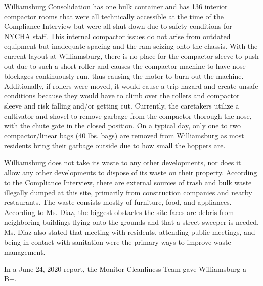 Williamsburg Consolidation has one bulk container and has 136 interior compactor rooms that were all technically accessible at the time of the Compliance Interview but were all shut down due to safety conditions for NYCHA staff. This internal compactor issues do not arise from outdated equipment but inadequate spacing and the ram seizing onto the chassis. With the current layout at Williamsburg, there is no place for the compactor sleeve to push out due to such a short roller and causes the compactor machine to have nose blockages continuously run, thus causing the motor to burn out the machine. Additionally, if rollers were moved, it would cause a trip hazard and create unsafe conditions because they would have to climb over the rollers and compactor sleeve and risk falling and/or getting cut. Currently, the caretakers utilize a cultivator and shovel to remove garbage from the compactor thorough the nose, with the chute gate in the closed position. On a typical day, only one to two compactor/linear bags (40 lbs. bags) are removed from Williamsburg as most residents bring their garbage outside due to how small the hoppers are.  

Williamsburg does not take its waste to any other developments, nor does it allow any other developments to dispose of its waste on their property. According to the Compliance Interview, there are external sources of trash and bulk waste illegally dumped at this site, primarily from construction companies and nearby restaurants. The waste consists mostly of furniture, food, and appliances. According to Ms. Diaz, the biggest obstacles the site faces are debris from neighboring buildings flying onto the grounds and that a street sweeper is needed. Ms. Diaz also stated that meeting with residents, attending public meetings, and being in contact with sanitation were the primary ways to improve waste management. 

In a June 24, 2020 report, the Monitor Cleanliness Team gave Williamsburg a B+.